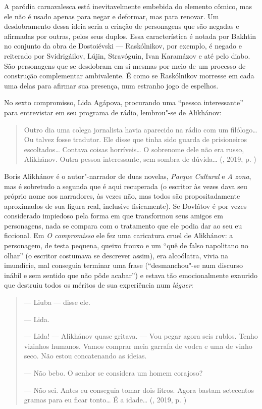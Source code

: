 A paródia carnavalesca está inevitavelmente embebida do elemento cômico,
mas ele não é usado apenas para negar e deformar, mas para renovar. Um
desdobramento dessa ideia seria a criação de personagens que são negadas
e afirmadas por outras, pelos seus duplos. Essa característica é notada
por Bakhtin no conjunto da obra de Dostoiévski --- Raskólnikov, por
exemplo, é negado e reiterado por Svidrigáilov, Lújin, Stravóguin, Ivan
Karamázov e até pelo diabo. São personagens que se desdobram em si
mesmas por meio de um processo de construção complementar ambivalente. É
como se Raskólnikov morresse em cada uma delas para afirmar sua
presença, num estranho jogo de espelhos.

No sexto compromisso, Lida Agápova, procurando uma ``pessoa
interessante'' para entrevistar em seu programa de rádio, lembrou"-se de
Alikhánov:

\begin{quotation}
Outro dia uma colega jornalista havia aparecido na rádio com um
filólogo\ldots{} Ou talvez fosse tradutor. Ele disse que tinha sido guarda de
prisioneiros escoltados\ldots{} Contava coisas horríveis\ldots{} O sobrenome dele
não era russo, Alikhánov. Outra pessoa interessante, sem sombra de
dúvida\ldots{}
{}(, 2019, p. \pageref{ref1})
\end{quotation}

Boris Alikhánov é o autor"-narrador de duas novelas, \emph{Parque
Cultural} e \emph{A zona}, mas é sobretudo a segunda que é aqui
recuperada (o escritor às vezes dava seu próprio nome aos narradores, às
vezes não, mas todos são propositadamente aproximados de sua figura
real, inclusive fisicamente). Se Dovlátov é por vezes considerado
impiedoso pela forma em que transformou seus amigos em personagens, nada
se compara com o tratamento que ele podia dar ao seu eu ficcional. Em
\emph{O compromisso} ele fez uma caricatura cruel de Alikhánov: a
personagem, de testa pequena, queixo frouxo e um ``quê de falso
napolitano no olhar'' (o escritor costumava se descrever assim), era
alcoólatra, vivia na imundície, mal conseguia terminar uma frase
(``desmanchou"-se num discurso inábil e sem sentido que não pôde
acabar'') e estava tão emocionalmente exaurido que destruiu todos os
méritos de sua experiência num \emph{láguer}:

\begin{quotation}
--- Liuba --- disse ele.

--- Lida.

--- Lida! --- Alikhánov quase gritava. --- Vou pegar agora seis rublos.
Tenho vizinhos humanos. Vamos comprar meia garrafa de vodca e uma de
vinho seco. Não estou concatenando as ideias.

--- Não bebo. O senhor se considera um homem corajoso?

--- Não sei. Antes eu conseguia tomar dois litros. Agora bastam
setecentos gramas para eu ficar tonto\ldots{} É a idade\ldots{}
{}(, 2019, p. \pageref{ref7})
\end{quotation}

